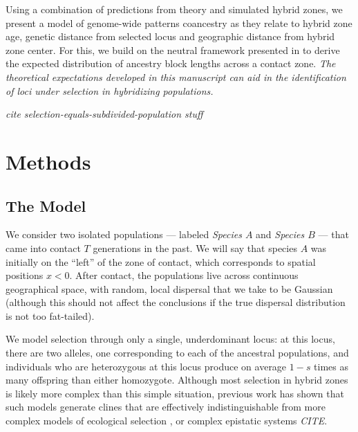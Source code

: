 \documentclass[11pt,letterpaper]{article}
\newcommand{\plr}[1]{{\em \color{blue} #1}}
\newcommand{\yb}[1]{{\em \color{magenta} #1}}
\begin{document}
Using a combination of predictions from theory and simulated hybrid zones, we present a model of genome-wide patterns coancestry as they relate to hybrid zone age, genetic distance from selected locus and geographic distance from hybrid zone center. For this, we build on the neutral framework presented in \citet{Sedghifar2015} to derive the expected distribution of ancestry block lengths across a contact zone.  
\yb{The theoretical expectations developed in this manuscript can aid in the identification of loci under selection in hybridizing populations.} 




\plr{cite selection-equals-subdivided-population stuff}

\section*{Methods}

\subsection*{The Model}

We consider two isolated populations
--- labeled \emph{Species $A$} and \emph{Species $B$} ---  
that came into contact $T$ generations in the past.  
We will say that species $A$ was initially on the ``left'' of the zone of contact, which corresponds to spatial positions $x<0$.  
After contact, the populations live across continuous geographical space,
with random, local dispersal that we take to be Gaussian
(although this should not affect the conclusions if the true dispersal distribution is not too fat-tailed).

We model selection through only a single, underdominant locus:
at this locus, there are two alleles, one corresponding to each of the ancestral populations,
and individuals who are heterozygous at this locus produce on average $1-s$ times as many offspring than either homozygote.
Although most selection in hybrid zones is likely more complex than this simple situation, 
previous work has shown that such models generate clines that are effectively indistinguishable from more complex models of ecological selection \citep{Barton1989, Barton1993},
or complex epistatic systems \plr{CITE}.
\end{document}

